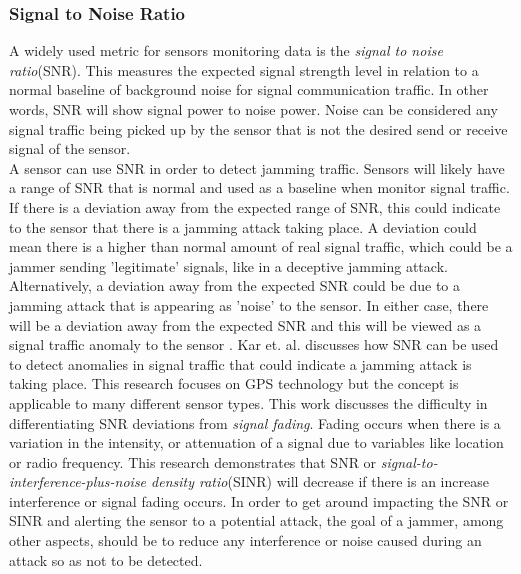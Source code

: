\documentclass[conference]{IEEEtran}
\begin{document}
\subsubsection{Signal to Noise Ratio}
A widely used metric for sensors monitoring data is the \textit{signal to noise ratio}(SNR). This measures the expected signal strength level in relation to a normal baseline of background noise for signal communication traffic. In other words, SNR will show signal power to noise power. Noise can be considered any signal traffic being picked up by the sensor that is not the desired send or receive signal of the sensor. \\
\indent A sensor can use SNR in order to detect jamming traffic. Sensors will likely have a range of SNR that is normal and used as a baseline when monitor signal traffic. If there is a deviation away from the expected range of SNR, this could indicate to the sensor that there is a jamming attack taking place. A deviation could mean there is a higher than normal amount of real signal traffic, which could be a jammer sending 'legitimate' signals, like in a deceptive jamming attack. Alternatively, a deviation away from the expected SNR could be due to a jamming attack that is appearing as 'noise' to the sensor. In either case, there will be a deviation away from the expected SNR and this will be viewed as a signal traffic anomaly to the sensor \cite{6}. 
\indent Kar et. al. discusses how SNR can be used to detect anomalies in signal traffic that could indicate a jamming attack is taking place\cite{6}. This research focuses on GPS technology but the concept is applicable to many different sensor types. This work discusses the difficulty in differentiating SNR deviations from \textit{signal fading}. Fading occurs when there is a variation in the intensity, or attenuation of a signal due to variables like location or radio frequency. This research demonstrates that SNR or \textit{signal-to-interference-plus-noise density ratio}(SINR) will decrease if there is an increase interference or signal fading occurs\cite{6}. In order to get around impacting the SNR or SINR and alerting the sensor to a potential attack, the goal of a jammer, among other aspects, should be to reduce any interference or noise caused during an attack so as not to be detected\cite{13}. 
\end{document}
